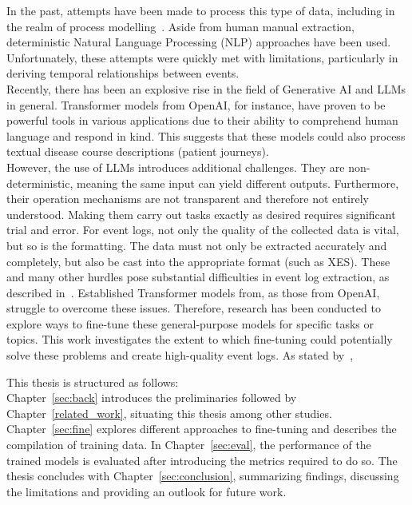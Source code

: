 In the past, attempts have been made to process this type of data, including in the realm of process modelling~\cite{friedrich_process_2011}. Aside from  human manual extraction,  deterministic Natural Language Processing (NLP) approaches have been used. Unfortunately, these attempts were quickly met with limitations, particularly in deriving temporal relationships between events.\\
Recently, there has been an explosive rise in the field of Generative AI and LLMs in general. Transformer models from OpenAI, for instance, have proven to be powerful tools in various applications due to their ability to comprehend human language and respond in kind. This suggests that these models could also process textual disease course descriptions (patient journeys).\\
However, the use of LLMs introduces additional challenges. They are non-deterministic, meaning the same input can yield different outputs. Furthermore, their operation mechanisms are not transparent and therefore not entirely understood. Making them carry out tasks exactly as desired requires significant trial and error. For event logs, not only the quality of the collected data is vital, but so is the formatting. The data must not only be extracted accurately and completely, but also be cast into the appropriate format (such as XES).
These and many other hurdles pose substantial difficulties in event log extraction, as described in~\cite{munoz-gama_process_2022}. Established Transformer models from, as those from OpenAI, struggle to overcome these issues. Therefore, research has been conducted to explore ways to fine-tune these general-purpose models for specific tasks or topics. This work investigates the extent to which fine-tuning could potentially solve these problems and create high-quality event logs. As stated by~\cite{latif_fine-tuning_2024}, 
\begin{quote}
\end{quote}

This thesis is structured as follows:\\
Chapter~\ref{sec:back} introduces the preliminaries followed by Chapter~\ref{related_work}, situating this thesis among other studies. Chapter~\ref{sec:fine} explores different approaches to fine-tuning and describes the compilation of training data. In Chapter~\ref{sec:eval}, the performance of the trained models is evaluated after introducing the metrics required to do so. The thesis concludes with Chapter~\ref{sec:conclusion}, summarizing findings, discussing the limitations and providing an outlook for future work.